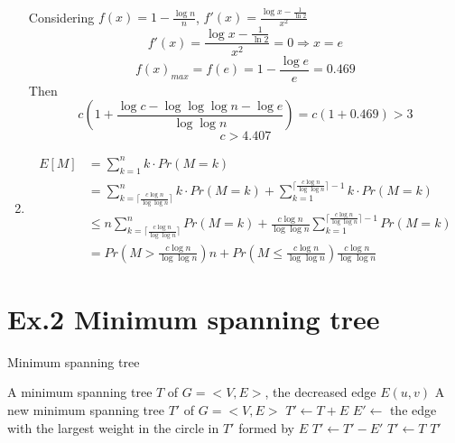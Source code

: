 \documentclass[a4paper]{article}
\begin{document}
\begin{enumerate}[1.]
\begin{align*}
		\end{align*}
		Considering $f(x)=1-\frac{\log{n}}{n}$, $f'(x)=\frac{\log{x}-\frac{1}{\ln{2}}}{x^2}$
		$$f'(x)=\frac{\log{x}-\frac{1}{\ln{2}}}{x^2}=0 \Rightarrow x=e$$
		$$f(x)_{max}=f(e)=1-\frac{\log{e}}{e}=0.469$$
		Then
		$$c(1+\frac{\log{c}-\log{\log{\log{n}}}-\log{e}}{\log{\log{n}}})=c(1+0.469) > 3$$
		$$c>4.407$$
		\item
		\begin{align*}
			E[M] &= \sum_{k=1}^n k\cdot Pr(M=k)\\
			&=\sum_{k=\lceil\frac{c\log{n}}{\log{\log{n}}}\rceil}^n k\cdot Pr(M=k)+\sum_{k=1}^{\lceil\frac{c\log{n}}{\log{\log{n}}}\rceil-1} k\cdot Pr(M=k)\\
			&\leq n\sum_{k=\lceil\frac{c\log{n}}{\log{\log{n}}}\rceil}^n Pr(M=k)+\frac{c\log{n}}{\log{\log{n}}}\sum_{k=1}^{\lceil\frac{c\log{n}}{\log{\log{n}}}\rceil-1}  Pr(M=k)\\
			&=Pr\left(M>\frac{c\log{n}}{\log{\log{n}}}\right)n+Pr\left(M\leq \frac{c\log{n}}{\log{\log{n}}}\right)\frac{c\log{n}}{\log{\log{n}}}
		\end{align*}
	\end{enumerate}

\section*{Ex.2 Minimum spanning tree}
\begin{algorithm}
	\caption{Minimum spanning tree}
	\begin{algorithmic}[1]
		\Require A minimum spanning tree $T$ of $G=<V,E>$, the decreased edge $E(u,v)$
		\Ensure A new minimum spanning tree $T'$ of $G=<V,E>$
		\State $T'\leftarrow T+E$
		\State $E'\leftarrow$ the edge with the largest weight in the circle in $T'$ formed by $E$
			\State $T'\leftarrow T'-E'$
		\Else
			\State $T'\leftarrow T$
		\EndIf
		\State\Return $T'$
	\end{algorithmic}
\end{algorithm}
\end{document}
